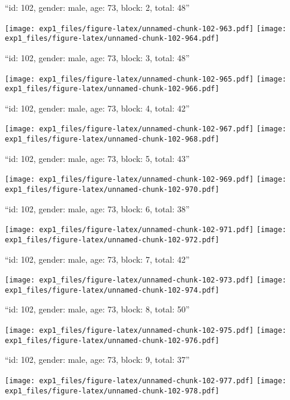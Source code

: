 \documentclass[11pt,,]{article}
\begin{document}
\newpage
[1] 

``id: 102, gender: male, age: 73, block: 2, total: 48''

\texttt{[image: exp1\_files/figure-latex/unnamed-chunk-102-963.pdf]}
\texttt{[image: exp1\_files/figure-latex/unnamed-chunk-102-964.pdf]}

\newpage
[1] 

``id: 102, gender: male, age: 73, block: 3, total: 48''

\texttt{[image: exp1\_files/figure-latex/unnamed-chunk-102-965.pdf]}
\texttt{[image: exp1\_files/figure-latex/unnamed-chunk-102-966.pdf]}

\newpage
[1] 

``id: 102, gender: male, age: 73, block: 4, total: 42''

\texttt{[image: exp1\_files/figure-latex/unnamed-chunk-102-967.pdf]}
\texttt{[image: exp1\_files/figure-latex/unnamed-chunk-102-968.pdf]}

\newpage
[1] 

``id: 102, gender: male, age: 73, block: 5, total: 43''

\texttt{[image: exp1\_files/figure-latex/unnamed-chunk-102-969.pdf]}
\texttt{[image: exp1\_files/figure-latex/unnamed-chunk-102-970.pdf]}

\newpage
[1] 

``id: 102, gender: male, age: 73, block: 6, total: 38''

\texttt{[image: exp1\_files/figure-latex/unnamed-chunk-102-971.pdf]}
\texttt{[image: exp1\_files/figure-latex/unnamed-chunk-102-972.pdf]}

\newpage
[1] 

``id: 102, gender: male, age: 73, block: 7, total: 42''

\texttt{[image: exp1\_files/figure-latex/unnamed-chunk-102-973.pdf]}
\texttt{[image: exp1\_files/figure-latex/unnamed-chunk-102-974.pdf]}

\newpage
[1] 

``id: 102, gender: male, age: 73, block: 8, total: 50''

\texttt{[image: exp1\_files/figure-latex/unnamed-chunk-102-975.pdf]}
\texttt{[image: exp1\_files/figure-latex/unnamed-chunk-102-976.pdf]}

\newpage
[1] 

``id: 102, gender: male, age: 73, block: 9, total: 37''

\texttt{[image: exp1\_files/figure-latex/unnamed-chunk-102-977.pdf]}
\texttt{[image: exp1\_files/figure-latex/unnamed-chunk-102-978.pdf]}
\end{document}
